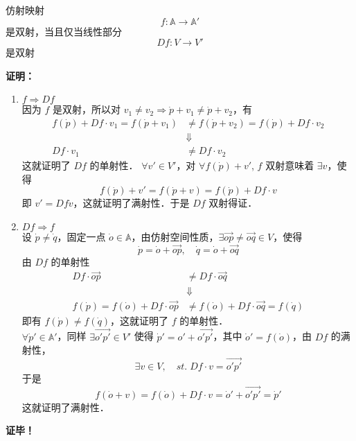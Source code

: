 \begin{theorem}{}\label{AfSp_the1}
仿射映射
\begin{equation}
f:\mathbb A\rightarrow\mathbb A' 
\end{equation}
是双射，当且仅当线性部分
\begin{equation}
Df:V\rightarrow V'
\end{equation}
是双射
\end{theorem}
\textbf{证明：}
\begin{enumerate}
\item $f\Rightarrow Df$\\

因为 $f$ 是双射，所以对 $v_1\neq v_2\Rightarrow \dot p+v_1\neq\dot p+v_2$，有
\begin{equation}
\begin{aligned}
f(\dot p)+Df\cdot v_1=f(\dot p+v_1)&\neq f(\dot p+v_2)=f(\dot p)+Df\cdot v_2\\
&\Downarrow\\
Df\cdot v_1&\neq Df\cdot v_2
\end{aligned}
\end{equation}
这就证明了 $Df$ 的单射性．  $\forall  v'\in V'$，对 $\forall f(\dot p)+v'$, $f$ 双射意味着 $\exists v$，使得 
\begin{equation}
f(\dot p)+v'=f(\dot p+v)=f(\dot p)+Df\cdot v
\end{equation}
即 $v'=Df\dot v$，这就证明了满射性．于是 $Df$ 双射得证．
\item $Df\Rightarrow f$\\
设 $\dot p\neq \dot q$，固定一点 $\dot o\in \mathbb A$，由仿射空间性质，$\exists \vec{op}\neq\vec{oq}\in V$，使得 
\begin{equation}
\dot p=\dot o+\vec{op},\quad\dot q=\dot o+\vec{oq} 
\end{equation}
由 $Df$ 的单射性
\begin{equation}
\begin{aligned}
Df\cdot \vec{op}&\neq Df\cdot \vec{oq}\\
&\Downarrow\\
f(\dot p)=f(\dot o)+Df\cdot \vec{op}&\neq f(\dot o)+Df\cdot \vec{oq}=f(\dot q)
\end{aligned}
\end{equation}
即有 $f(\dot p)\neq f(\dot q)$，这就证明了 $f$ 的单射性．\\

$\forall \dot p'\in\mathbb A'$，同样 $\exists\vec{o'p'}\in V'$ 使得 $\dot p'=o'+\vec{o'p'}$，其中 $\dot o'=f(\dot o)$，由 $Df$ 的满射性，
\begin{equation}
\exists v\in V,\quad st.\; Df\cdot v=\vec{o'p'}
\end{equation}
于是
\begin{equation}
f(\dot o+v)=f(\dot o)+Df\cdot v=\dot o'+\vec{o'p'}=\dot p'
\end{equation}
这就证明了满射性．
\end{enumerate}
\textbf{证毕！}

